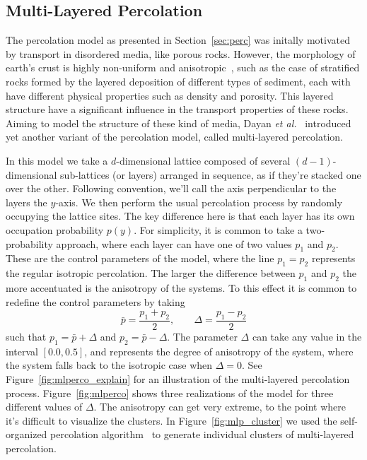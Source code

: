 \subsection{Multi-Layered Percolation}
\label{sec:mlp}

The percolation model as presented in Section~\ref{sec:perc} was initally
motivated by transport in disordered media, like porous rocks. However, the
morphology of earth's crust is highly non-uniform and
anisotropic~\cite{Englman1986}, such as the case of stratified rocks formed by
the layered deposition of different types of sediment, each with have different
physical properties such as density and porosity. This layered structure have a
significant influence in the transport properties of these rocks. Aiming to
model the structure of these kind of media, Dayan \textit{et
al.}~\cite{Dayan1991} introduced yet another variant of the percolation
model, called multi-layered percolation. 

In this model we take a $d$-dimensional lattice composed of several
$(d-1)$-dimensional sub-lattices (or layers) arranged in sequence, as if
they're stacked one over the other. Following convention, we'll call the axis
perpendicular to the layers the $y$-axis. We then perform the usual percolation
process by randomly occupying the lattice sites. The key difference here is
that each layer has its own occupation probability $p(y)$. For simplicity, it
is common to take a two-probability approach, where each layer can have one of
two values $p_1$ and $p_2$. These are the control parameters of the model,
where the line $p_1=p_2$ represents the regular isotropic percolation. The
larger the difference between $p_1$ and $p_2$ the more accentuated is the
anisotropy of the systems. To this effect it is common to redefine the
control parameters by taking
\begin{equation}
    \bar{p}=\frac{p_1 + p_2}{2},\;\;\;\;\;\;\;\Delta=\frac{p_1 - p_2}{2}
\end{equation}
such that $p_1 = \bar{p} + \Delta$ and $p_2 = \bar{p} - \Delta$. The parameter
$\Delta$ can take any value in the interval $[0.0,0.5]$, and represents the
degree of anisotropy of the system, where the system falls back to the
isotropic case when $\Delta=0$. See Figure~\ref{fig:mlperco_explain} for an
illustration of the multi-layered percolation process. Figure~\ref{fig:mlperco}
shows three realizations of the model for three different values of $\Delta$.
The anisotropy can get very extreme, to the point where it's difficult to
visualize the clusters. In Figure~\ref{fig:mlp_cluster} we used the
self-organized percolation algorithm~\cite{Parteli2010} to generate individual
clusters of multi-layered percolation.

